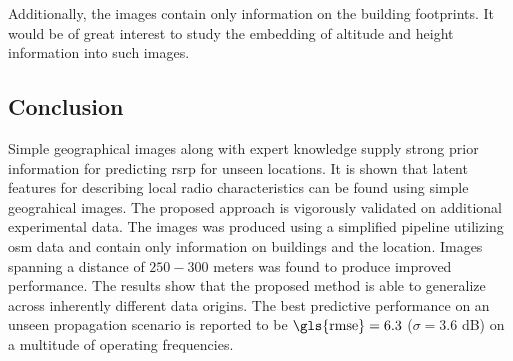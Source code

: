 Additionally, the images contain only information on the building footprints. It would be of great interest to study the embedding of altitude and height information into such images. 


\subsection{Conclusion}\label{subsec:conclusion_v3}
Simple geographical images along with expert knowledge supply strong prior information for predicting \gls{rsrp} for unseen locations. It is shown that latent features for describing local radio characteristics can be found using simple geograhical images. The proposed approach is vigorously validated on additional experimental data. The images was produced using a simplified pipeline utilizing \gls{osm} data and contain only information on buildings and the location. Images spanning a distance of $250-300$ meters was found to produce improved performance. The results show that the proposed method is able to generalize across inherently different data origins. The best predictive performance on an unseen propagation scenario is reported to be $\text{\gls{rmse}} = 6.3$ ($\sigma = 3.6$ dB) on a multitude of operating frequencies.

